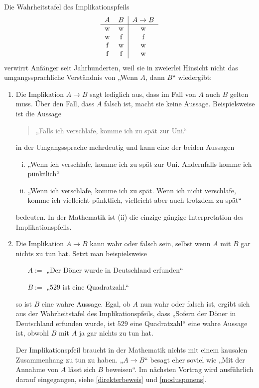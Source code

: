 \begin{bem}
    Die Wahrheitstafel des Implikationspfeils
    \[\begin{tabular}{cc|c}
        $A$ & $B$ &  $A\to B$  \\
        \hline
        w&w&w\\
        w&f&f\\
        f&w&w\\
        f&f&w\\
    \end{tabular}\]
    verwirrt Anfänger seit Jahrhunderten, weil sie in zweierlei Hinsicht nicht das umgangssprachliche Verständnis von „Wenn $A$, dann $B$“ wiedergibt:
    \begin{enumerate}[1.]
        \item Die Implikation $A\to B$ sagt lediglich aus, dass im Fall von $A$ auch $B$ gelten muss. Über den Fall, dass $A$ falsch ist, macht sie keine Aussage. Beispielsweise ist die Aussage
        \begin{quote}
            „Falls ich verschlafe, komme ich zu spät zur Uni.“
        \end{quote}
        in der Umgangssprache mehrdeutig und kann eine der beiden Aussagen
        \begin{enumerate}[(i)]
            \item „Wenn ich verschlafe, komme ich zu spät zur Uni. Andernfalls komme ich pünktlich“
            \item „Wenn ich verschlafe, komme ich zu spät. Wenn ich nicht verschlafe, komme ich vielleicht pünktlich, vielleicht aber auch trotzdem zu spät“
        \end{enumerate}
        bedeuten. In der Mathematik ist (ii) die einzige gängige Interpretation des Implikationspfeils.
        \item Die Implikation $A\to B$ kann wahr oder falsch sein, selbst wenn $A$ mit $B$ gar nichts zu tun hat. Setzt man beispielsweise
        \begin{itemize}[labelindent=3em, leftmargin=!, labelwidth=]
            \item[$A:=$] „Der Döner wurde in Deutschland erfunden“
            \item[$B:=$] „$529$ ist eine Quadratzahl.“
        \end{itemize}
        so ist $B$ eine wahre Aussage. Egal, ob $A$ nun wahr oder falsch ist, ergibt sich aus der Wahrheitstafel des Implikationspfeils, dass „Sofern der Döner in Deutschland erfunden wurde, ist $529$ eine Quadratzahl“ eine wahre Aussage ist, obwohl $B$ mit $A$ ja gar nichts zu tun hat.

        Der Implikationspfeil braucht in der Mathematik nichts mit einem kausalen Zusammenhang zu tun zu haben. „$A\to B$“ besagt eher soviel wie „Mit der Annahme von $A$ lässt sich $B$ beweisen“. Im nächsten Vortrag wird ausführlich darauf eingegangen, siehe \cref{direkterbeweis} und \cref{modusponens}.
    \end{enumerate}
\end{bem}





